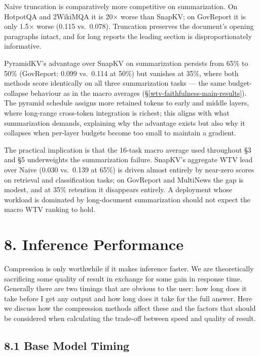 \documentclass[10pt,letterpaper]{article}
\begin{document}
Naive truncation is comparatively more competitive on summarization. On HotpotQA and 2WikiMQA it
is 20$\times$ worse than SnapKV; on GovReport it is only 1.5$\times$ worse (0.115 vs.\ 0.078).
Truncation preserves the document's opening paragraphs intact, and for long reports the leading
section is disproportionately informative.

PyramidKV's advantage over SnapKV on summarization persists from 65\% to 50\%
(GovReport: 0.099 vs.\ 0.114 at 50\%) but vanishes at 35\%, where both methods score
identically on all three summarization tasks --- the same budget-collapse behaviour as in the
macro averages (§\ref{wtv-faithfulness-main-results}). The pyramid schedule assigns more
retained tokens to early and middle layers, where long-range cross-token integration is
richest; this aligns with what summarization demands, explaining why the advantage
exists but also why it collapses when per-layer budgets become too small to maintain a
gradient.

The practical implication is that the 16-task macro average used throughout §3 and §5 underweights
the summarization failure. SnapKV's aggregate WTV lead over Naive (0.030 vs.\ 0.139 at 65\%)
is driven almost entirely by near-zero scores on retrieval and classification tasks; on
GovReport and MultiNews the gap is modest, and at 35\% retention it disappears entirely. A
deployment whose workload is dominated by long-document summarization should not expect the
macro WTV ranking to hold.

\hypertarget{inference-performance}{%
\section{8. Inference Performance}\label{inference-performance}}

Compression is only worthwhile if it makes inference faster. We are theoretically sacrificing 
some quality of result in exchange for some gain in response time.  Generally there are two 
timings that are obvious to the user: how long does it take before I get any output and
how long does it take for the full answer.  Here we discuss how the compression methods
affect these and the factors that should be considered when calculating the trade-off between
speed and quality of result.

\subsection{8.1 Base Model Timing}\label{base-model-timing} 
\end{document}
